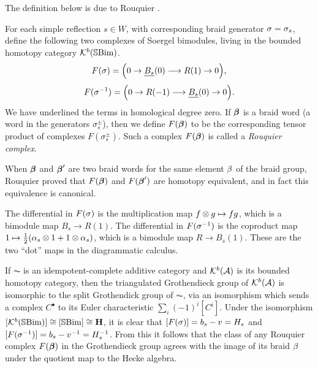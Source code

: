 The definition below is due to Rouquier \cite{Rou04}.


\begin{definition}\label{def:Rouquier}
For each simple reflection $s\in W$, with corresponding braid generator $\sigma = \sigma_s$, define the following two complexes of Soergel bimodules, living in the bounded homotopy category ${\mathcal{K}}^b({\mathbb{S}}{\rm Bim })$.
\[ F(\sigma) = \Big(0 \rightarrow \underline{B_{s}}(0) \longrightarrow R(1) \rightarrow 0\Big),\]
\[ F(\sigma^{-1}) = \Big(0 \rightarrow R(-1) \longrightarrow \underline{B_{s}}(0) \rightarrow 0 \Big). \]
We have underlined the terms in homological degree zero. If $\boldsymbol{\beta}$ is a braid word (a word in the generators $\sigma_s^\pm$), then we define $F(\boldsymbol{\beta})$ to be the corresponding tensor product of complexes $F(\sigma_s^\pm)$. Such a complex $F(\boldsymbol{\beta})$ is called a \emph{Rouquier complex}.
\end{definition}

When $\boldsymbol{\beta}$ and $\boldsymbol{\beta}'$ are two braid words for the same element $\beta$ of the braid group, Rouquier proved that $F(\boldsymbol{\beta})$ and $F(\boldsymbol{\beta}')$ are homotopy equivalent, and in fact this equivalence is canonical.

\begin{remark} \label{rmk:dotsdefn} The differential in $F(\sigma)$ is the multiplication map $f \otimes g \mapsto fg$, which is a bimodule map $B_s \to R(1)$. The differential in
$F(\sigma^{-1})$ is the coproduct map $1 \mapsto \frac{1}{2}(\alpha_s \otimes 1 + 1 \otimes \alpha_s)$, which is a bimodule map $R \to B_s(1)$. These are the two ``dot'' maps in the diagrammatic calculus. \end{remark}

If $\AC$ is an idempotent-complete additive category and ${\mathcal{K}}^b({\mathcal{A}})$ is its bounded homotopy category, then the triangulated Grothendieck group of ${\mathcal{K}}^b({\mathcal{A}})$ is isomorphic to the split
Grothendick group of $\AC$, via an isomorphism which sends a complex $C^\bullet$ to its Euler characteristic
$\sum_{i}(-1)^i[C^i]$. Under the isomorphism $[{\mathcal{K}}^b({\mathbb{S}}{\rm Bim })] \cong [{\mathbb{S}}{\rm Bim }] \cong {\mathbf H}$, it is clear that $[F(\sigma)] = b_s - v = H_s$ and $[F(\sigma^{-1})] = b_s - v^{-1} = H_s^{-1}$.  From this it follows that the class of any Rouquier complex $F(\boldsymbol{\beta})$ in the Grothendieck group agrees with the image of its braid $\beta$ under the quotient map to the Hecke algebra.  

